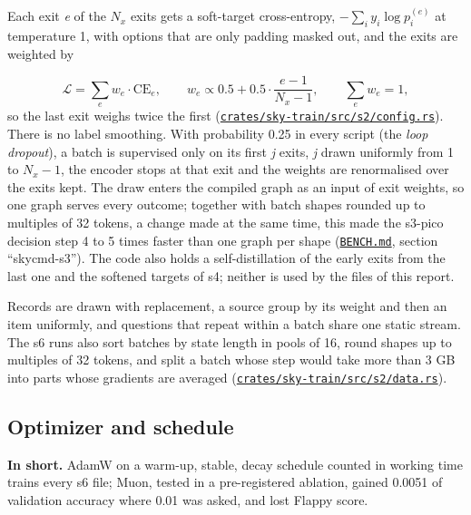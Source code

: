 \documentclass[10pt]{article}
\begin{document}
Each exit \emph{e} of the $N_x$ exits gets a soft-target cross-entropy, $-\sum_{i} y_{i} \log p_{i}^{(e)}$ at temperature 1, with options that are only padding masked out, and the exits are weighted by

\begin{equation}\label{eq:6}
\mathcal{L} = \sum_e w_e \cdot \mathrm{CE}_e, \qquad w_e \propto 0.5 + 0.5 \cdot \frac{e - 1}{N_x - 1}, \qquad \sum_e w_e = 1,
\end{equation}
so the last exit weighs twice the first (\href{https://github.com/maxgfr/skycmd/blob/main/crates/sky-train/src/s2/config.rs}{\texttt{crates/\allowbreak{}sky-train/\allowbreak{}src/\allowbreak{}s2/\allowbreak{}config.rs}}). There is no label smoothing. With probability 0.25 in every script (the \emph{loop dropout}), a batch is supervised only on its first \emph{j} exits, \emph{j} drawn uniformly from 1 to $N_x - 1$, the encoder stops at that exit and the weights are renormalised over the exits kept. The draw enters the compiled graph as an input of exit weights, so one graph serves every outcome; together with batch shapes rounded up to multiples of 32 tokens, a change made at the same time, this made the s3-pico decision step 4 to 5 times faster than one graph per shape (\href{https://github.com/maxgfr/skycmd/blob/main/BENCH.md}{\texttt{BENCH.md}}, section ``skycmd-s3''). The code also holds a self-distillation of the early exits from the last one and the softened targets of s4; neither is used by the files of this report.

Records are drawn with replacement, a source group by its weight and then an item uniformly, and questions that repeat within a batch share one static stream. The s6 runs also sort batches by state length in pools of 16, round shapes up to multiples of 32 tokens, and split a batch whose step would take more than 3 GB into parts whose gradients are averaged (\href{https://github.com/maxgfr/skycmd/blob/main/crates/sky-train/src/s2/data.rs}{\texttt{crates/\allowbreak{}sky-train/\allowbreak{}src/\allowbreak{}s2/\allowbreak{}data.rs}}).

\subsection{Optimizer and schedule}\label{sec:4.4}

\textbf{In short.} AdamW on a warm-up, stable, decay schedule counted in working time trains every s6 file; Muon, tested in a pre-registered ablation, gained 0.0051 of validation accuracy where 0.01 was asked, and lost Flappy score.
\end{document}
